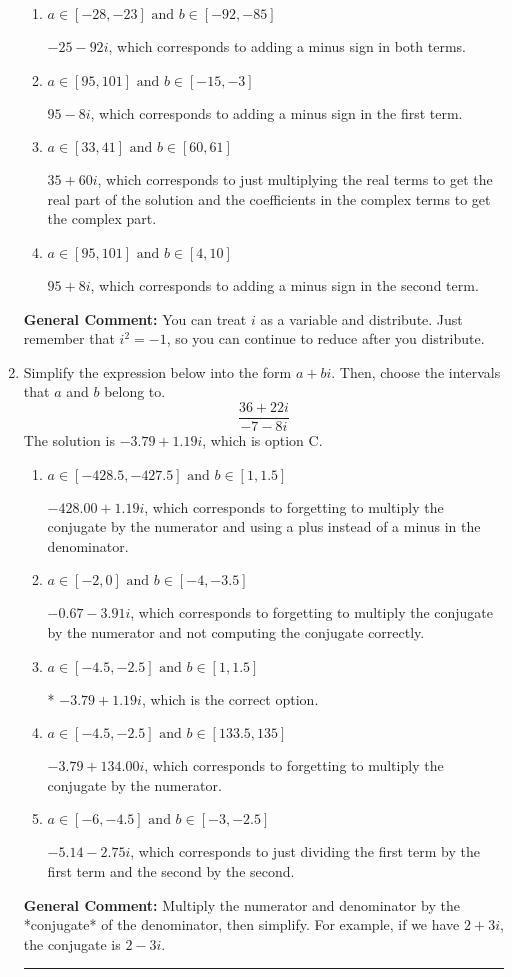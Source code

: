 \documentclass{extbook}[14pt]
\newcommand{\litem}[1]{\item #1

\rule{\textwidth}{0.4pt}}
\begin{document}
\begin{enumerate}
{\begin{enumerate}[label=\Alph*.]
* $-25 + 92 i$, which is the correct option.
\item \( a \in [-28, -23] \text{ and } b \in [-92, -85] \)

 $-25 - 92 i$, which corresponds to adding a minus sign in both terms.
\item \( a \in [95, 101] \text{ and } b \in [-15, -3] \)

 $95 - 8 i$, which corresponds to adding a minus sign in the first term.
\item \( a \in [33, 41] \text{ and } b \in [60, 61] \)

 $35 + 60 i$, which corresponds to just multiplying the real terms to get the real part of the solution and the coefficients in the complex terms to get the complex part.
\item \( a \in [95, 101] \text{ and } b \in [4, 10] \)

 $95 + 8 i$, which corresponds to adding a minus sign in the second term.
\end{enumerate}

\textbf{General Comment:} You can treat $i$ as a variable and distribute. Just remember that $i^2=-1$, so you can continue to reduce after you distribute.
}
\litem{
Simplify the expression below into the form $a+bi$. Then, choose the intervals that $a$ and $b$ belong to.
\[ \frac{36 + 22 i}{-7 - 8 i} \]
The solution is \( -3.79  + 1.19 i \), which is option C.\begin{enumerate}[label=\Alph*.]
\item \( a \in [-428.5, -427.5] \text{ and } b \in [1, 1.5] \)

 $-428.00  + 1.19 i$, which corresponds to forgetting to multiply the conjugate by the numerator and using a plus instead of a minus in the denominator.
\item \( a \in [-2, 0] \text{ and } b \in [-4, -3.5] \)

 $-0.67  - 3.91 i$, which corresponds to forgetting to multiply the conjugate by the numerator and not computing the conjugate correctly.
\item \( a \in [-4.5, -2.5] \text{ and } b \in [1, 1.5] \)

* $-3.79  + 1.19 i$, which is the correct option.
\item \( a \in [-4.5, -2.5] \text{ and } b \in [133.5, 135] \)

 $-3.79  + 134.00 i$, which corresponds to forgetting to multiply the conjugate by the numerator.
\item \( a \in [-6, -4.5] \text{ and } b \in [-3, -2.5] \)

 $-5.14  - 2.75 i$, which corresponds to just dividing the first term by the first term and the second by the second.
\end{enumerate}

\textbf{General Comment:} Multiply the numerator and denominator by the *conjugate* of the denominator, then simplify. For example, if we have $2+3i$, the conjugate is $2-3i$.
}
\end{enumerate}
\end{document}
